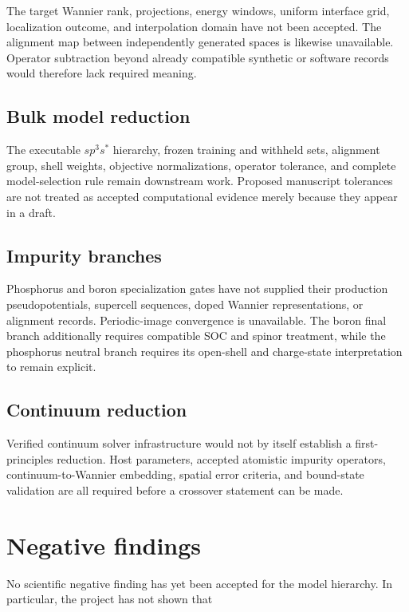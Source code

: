 The target Wannier rank, projections, energy windows, uniform interface grid,
localization outcome, and interpolation domain have not been accepted. The
alignment map between independently generated spaces is likewise unavailable.
Operator subtraction beyond already compatible synthetic or software records
would therefore lack required meaning.

\subsection{Bulk model reduction}

The executable $sp^3s^{\ast}$ hierarchy, frozen training and withheld sets,
alignment group, shell weights, objective normalizations, operator tolerance,
and complete model-selection rule remain downstream work. Proposed manuscript
tolerances are not treated as accepted computational evidence merely because
they appear in a draft.

\subsection{Impurity branches}

Phosphorus and boron specialization gates have not supplied their production
pseudopotentials, supercell sequences, doped Wannier representations, or
alignment records. Periodic-image convergence is unavailable. The boron final
branch additionally requires compatible SOC and spinor treatment, while the
phosphorus neutral branch requires its open-shell and charge-state
interpretation to remain explicit.

\subsection{Continuum reduction}

Verified continuum solver infrastructure would not by itself establish a
first-principles reduction. Host parameters, accepted atomistic impurity
operators, continuum-to-Wannier embedding, spatial error criteria, and
bound-state validation are all required before a crossover statement can be
made.

\section{Negative findings}

No scientific negative finding has yet been accepted for the model hierarchy.
In particular, the project has not shown that

